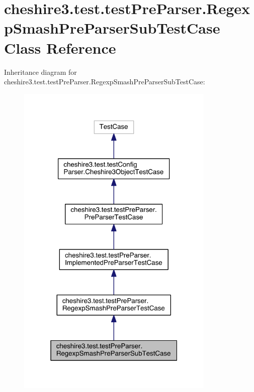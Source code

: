 \hypertarget{classcheshire3_1_1test_1_1test_pre_parser_1_1_regexp_smash_pre_parser_sub_test_case}{\section{cheshire3.\-test.\-test\-Pre\-Parser.\-Regexp\-Smash\-Pre\-Parser\-Sub\-Test\-Case Class Reference}
\label{classcheshire3_1_1test_1_1test_pre_parser_1_1_regexp_smash_pre_parser_sub_test_case}
}


Inheritance diagram for cheshire3.\-test.\-test\-Pre\-Parser.\-Regexp\-Smash\-Pre\-Parser\-Sub\-Test\-Case\-:
\nopagebreak
\begin{figure}[H]
\begin{center}
\leavevmode
\includegraphics[width=268pt]{classcheshire3_1_1test_1_1test_pre_parser_1_1_regexp_smash_pre_parser_sub_test_case__inherit__graph}
\end{center}
\end{figure}



